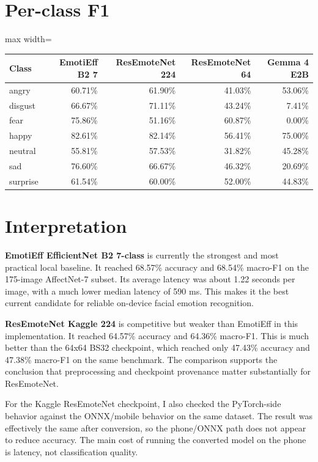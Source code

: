 \documentclass[11pt,a4paper]{article}
\begin{document}
\section*{Per-class F1}
\begin{center}
\begin{adjustbox}{max width=\textwidth}
\begin{tabular}{lrrrr}
\toprule
Class & EmotiEff B2 7 & ResEmoteNet 224 & ResEmoteNet 64 & Gemma 4 E2B \\
\midrule
angry & 60.71\% & 61.90\% & 41.03\% & 53.06\% \\
disgust & 66.67\% & 71.11\% & 43.24\% & 7.41\% \\
fear & 75.86\% & 51.16\% & 60.87\% & 0.00\% \\
happy & 82.61\% & 82.14\% & 56.41\% & 75.00\% \\
neutral & 55.81\% & 57.53\% & 31.82\% & 45.28\% \\
sad & 76.60\% & 66.67\% & 46.32\% & 20.69\% \\
surprise & 61.54\% & 60.00\% & 52.00\% & 44.83\% \\
\bottomrule
\end{tabular}
\end{adjustbox}
\end{center}

\section*{Interpretation}
\textbf{EmotiEff EfficientNet B2 7-class} is currently the strongest and most practical local baseline. It reached 68.57\% accuracy and 68.54\% macro-F1 on the 175-image AffectNet-7 subset. Its average latency was about 1.22 seconds per image, with a much lower median latency of 590 ms. This makes it the best current candidate for reliable on-device facial emotion recognition.

\textbf{ResEmoteNet Kaggle 224} is competitive but weaker than EmotiEff in this implementation. It reached 64.57\% accuracy and 64.36\% macro-F1. This is much better than the 64x64 BS32 checkpoint, which reached only 47.43\% accuracy and 47.38\% macro-F1 on the same benchmark. The comparison supports the conclusion that preprocessing and checkpoint provenance matter substantially for ResEmoteNet.

For the Kaggle ResEmoteNet checkpoint, I also checked the PyTorch-side behavior against the ONNX/mobile behavior on the same dataset. The result was effectively the same after conversion, so the phone/ONNX path does not appear to reduce accuracy. The main cost of running the converted model on the phone is latency, not classification quality.
\end{document}
